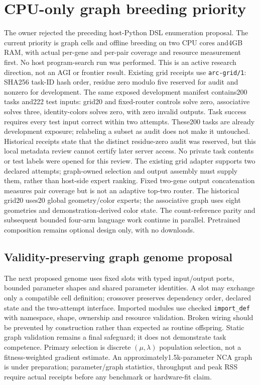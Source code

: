 \documentclass[11pt]{article}
\begin{document}
\section{CPU-only graph breeding priority}
The owner rejected the preceding host-Python DSL enumeration proposal. The
current priority is graph cells and offline breeding on two CPU cores and4GB
RAM, with actual per-gene and per-pair coverage and resource measurement first.
No host program-search run was performed. This is an active research
direction, not an AGI or frontier result. Existing grid receipts use
\texttt{arc-grid/1}: SHA256 task-ID hash order, residue zero modulo five reserved
for audit and nonzero for development. The same exposed development manifest
contains200 tasks and222 test inputs: grid20 and fixed-router controls solve zero,
associative solves three, identity-colors solves zero, with zero invalid outputs.
Task success requires every test input correct within two attempts.
These200 tasks are already development exposure; relabeling a subset as audit
does not make it untouched. Historical receipts state that the distinct residue-zero
audit was reserved, but this local metadata review cannot certify later server
access. No private task contents or test labels were opened for this review.
The existing grid adapter supports two declared attempts; graph-owned selection
and output assembly must supply them, rather than host-side expert ranking.
Fixed two-gene output concatenation measures pair coverage but is not an adaptive
top-two router. The historical grid20 uses20 global geometry/color experts;
the associative graph uses eight geometries and demonstration-derived color state.
The count-reference parity and subsequent bounded four-arm language work continue
in parallel. Pretrained composition remains optional design only, with no downloads.

\subsection{Validity-preserving graph genome proposal}
The next proposed genome uses fixed slots with typed input/output ports, bounded
parameter shapes and shared parameter identities. A slot may exchange only a
compatible cell definition; crossover preserves dependency order, declared state
and the two-attempt interface. Imported modules use checked \texttt{import\_def}
with namespace, shape, ownership and resource validation. Broken wiring should
be prevented by construction rather than expected as routine offspring. Static
graph validation remains a final safeguard; it does not demonstrate task competence.
Primary selection is discrete $(\mu,\lambda)$ population selection, not a
fitness-weighted gradient estimate. An approximately1.5k-parameter NCA graph is
under preparation; parameter/graph statistics, throughput and peak RSS require
actual receipts before any benchmark or hardware-fit claim.
\end{document}

